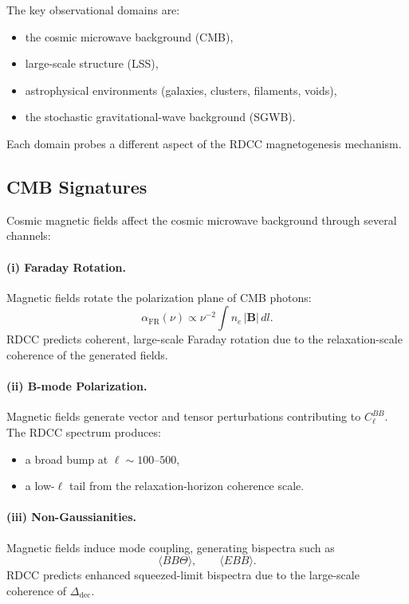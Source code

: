 \documentclass[11pt,a4paper]{article}
\begin{document}
The key observational domains are:
\begin{itemize}
\item the cosmic microwave background (CMB),
\item large-scale structure (LSS),
\item astrophysical environments (galaxies, clusters, filaments, voids),
\item the stochastic gravitational-wave background (SGWB).
\end{itemize}

Each domain probes a different aspect of the RDCC magnetogenesis mechanism.

\subsection{CMB Signatures}

Cosmic magnetic fields affect the cosmic microwave background through several channels:

\paragraph{(i) Faraday Rotation.}
Magnetic fields rotate the polarization plane of CMB photons:
\begin{equation}
\alpha_{\mathrm{FR}}(\nu)
\propto
\nu^{-2}
\int n_{e}\,|\mathbf{B}|\,dl.
\end{equation}
RDCC predicts coherent, large-scale Faraday rotation due to the relaxation-scale coherence
of the generated fields.

\paragraph{(ii) B-mode Polarization.}
Magnetic fields generate vector and tensor perturbations contributing to $C_{\ell}^{BB}$.
The RDCC spectrum produces:
\begin{itemize}
\item a broad bump at $\ell \sim 100$–$500$,
\item a low-$\ell$ tail from the relaxation-horizon coherence scale.
\end{itemize}

\paragraph{(iii) Non-Gaussianities.}
Magnetic fields induce mode coupling, generating bispectra such as
\begin{equation}
\langle B B \Theta \rangle,
\qquad
\langle E B B \rangle.
\end{equation}
RDCC predicts enhanced squeezed-limit bispectra due to the large-scale coherence of
$\Delta_{\mathrm{dec}}$.
\end{document}
